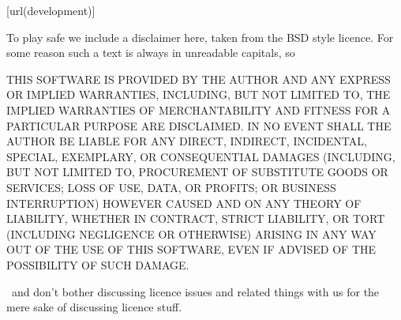 \startlines
\goto{\url[development]}[url(development)]
\stoplines

\stopsubject

\startsubject[title={Disclaimer}]

To play safe we include a disclaimer here, taken from the BSD style licence. For
some reason such a text is always in unreadable capitals, so \unknown

\start \txx \blue
THIS SOFTWARE IS PROVIDED BY THE AUTHOR  AND ANY EXPRESS OR
IMPLIED WARRANTIES, INCLUDING, BUT NOT LIMITED TO, THE IMPLIED WARRANTIES
OF MERCHANTABILITY AND FITNESS FOR A PARTICULAR PURPOSE ARE DISCLAIMED.
IN NO EVENT SHALL THE AUTHOR BE LIABLE FOR ANY DIRECT, INDIRECT,
INCIDENTAL, SPECIAL, EXEMPLARY, OR CONSEQUENTIAL DAMAGES (INCLUDING, BUT
NOT LIMITED TO, PROCUREMENT OF SUBSTITUTE GOODS OR SERVICES; LOSS OF USE,
DATA, OR PROFITS; OR BUSINESS INTERRUPTION) HOWEVER CAUSED AND ON ANY
THEORY OF LIABILITY, WHETHER IN CONTRACT, STRICT LIABILITY, OR TORT
(INCLUDING NEGLIGENCE OR OTHERWISE) ARISING IN ANY WAY OUT OF THE USE OF
THIS SOFTWARE, EVEN IF ADVISED OF THE POSSIBILITY OF SUCH DAMAGE.
\stop

\unknown\ and don't bother discussing licence issues and related things with us
for the mere sake of discussing licence stuff.

\stopsubject

\stopdocument
